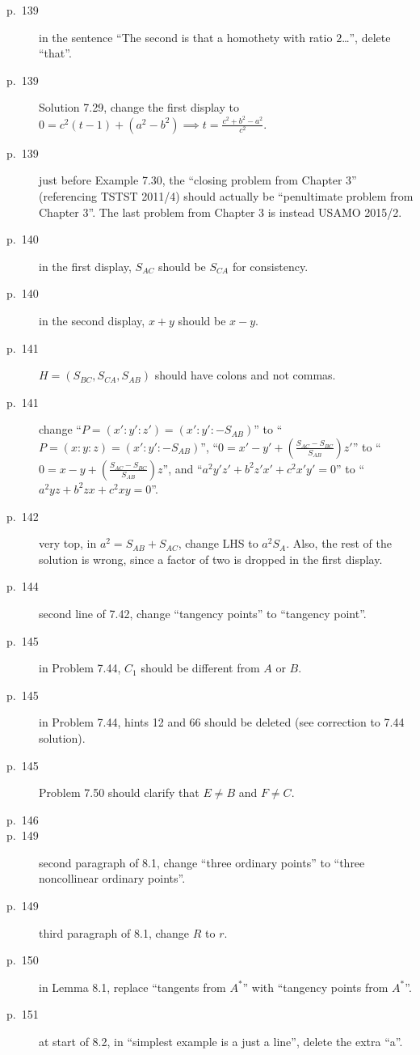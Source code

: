 \documentclass[11pt]{scrartcl}
\begin{document}
\begin{description}
\item[p.\  139] in the sentence ``The second is that a homothety with ratio $2$\dots'', delete ``that''.
\item[p.\  139] Solution 7.29, change the first display to
  $0 = c^2(t-1) + (a^2-b^2) \implies t = \frac{c^2+b^2-a^2}{c^2}$.
\item[p.\  139] just before Example 7.30, the ``closing problem from Chapter 3''
  (referencing TSTST 2011/4) should actually be ``penultimate problem from Chapter 3''.
  The last problem from Chapter 3 is instead USAMO 2015/2.
\item[p.\  140] in the first display, $S_{AC}$ should be $S_{CA}$ for consistency.
\item[p.\  140] in the second display, $x+y$ should be $x-y$.
\item[p.\  141] $H = (S_{BC},S_{CA},S_{AB})$ should have
  colons and not commas.
\item[p.\  141] change ``$P = \left(x' : y' : z'\right) = \left(x' : y' : -S_{AB}\right)$''
  to ``$P = \left(x : y : z\right) = \left(x' : y' : -S_{AB}\right)$'',
  ``$0 = x' - y' + \left( \frac{S_{AC}-S_{BC}}{S_{AB}} \right) z'$''
  to ``$0 = x - y + \left( \frac{S_{AC}-S_{BC}}{S_{AB}} \right) z$'',
  and ``$a^2 y'z' + b^2 z'x' + c^2 x'y' = 0$''
  to ``$a^2 yz + b^2 zx + c^2 xy = 0$''.
\item[p.\  142] very top, in $a^2=S_{AB}+S_{AC}$, change LHS to $a^2S_A$.
  Also, the rest of the solution is wrong, since a factor of two is dropped in the first display.
\item[p.\  144] second line of 7.42, change ``tangency points'' to ``tangency point''.
\item[p.\  145] in Problem 7.44, $C_1$ should be different from $A$ or $B$.
\item[p.\  145] in Problem 7.44, hints 12 and 66 should be deleted (see correction to 7.44 solution).
\item[p.\  145] Problem 7.50 should clarify that $E \neq B$ and $F \neq C$.
\item[p.\  146] 
\item[p.\  149] second paragraph of 8.1, change ``three ordinary points''
  to ``three noncollinear ordinary points''.
\item[p.\  149] third paragraph of 8.1, change $R$ to $r$.
\item[p.\  150] in Lemma 8.1, replace ``tangents from $A^\ast$'' with ``tangency points from $A^\ast$''.
\item[p.\  151] at start of 8.2, in ``simplest example is a just a line'', delete the extra ``a''.

\end{description}
\end{document}
